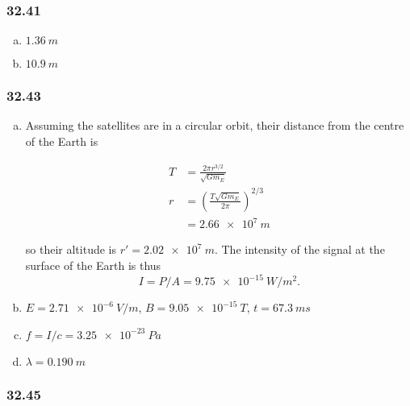 \documentclass{article}
\begin{document}
\subsubsection{32.41}

\begin{enumerate}[(a)]
  \item $\qty{1.36}{m}$

  \item $\qty{10.9}{m}$
\end{enumerate}

\subsubsection{32.43}

\begin{enumerate}[(a)]
  \item Assuming the satellites are in a circular orbit, their distance from the centre of the Earth is

        \begin{align*}
          T & = \frac{2 \pi r^{3 / 2}}{\sqrt{G m_E}}                \\
          r & = \left( \frac{T \sqrt{G m_E}}{2 \pi} \right)^{2 / 3} \\
            & = \qty{2.66e7}{m}
        \end{align*}

        so their altitude is $r' = \qty{2.02e7}{m}$. The intensity of the signal at the surface of the Earth is thus \[I = P / A = \qty{9.75e-15}{W/m^2}.\]

  \item $E = \qty{2.71e-6}{V/m}$, $B = \qty{9.05e-15}{T}$, $t = \qty{67.3}{ms}$

  \item $f = I / c = \qty{3.25e-23}{Pa}$

  \item $\lambda = \qty{0.190}{m}$
\end{enumerate}

\subsubsection{32.45}
\end{document}
